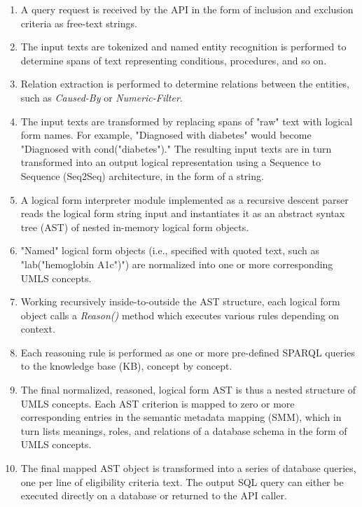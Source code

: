 \documentclass[../main.tex]{subfiles}
\begin{document}
\begin{enumerate}
    \item{A query request is received by the API in the form of inclusion and exclusion criteria as free-text strings.}
    \item{The input texts are tokenized and named entity recognition is performed to determine spans of text representing conditions, procedures, and so on.}
    \item{Relation extraction is performed to determine relations between the entities, such as \textit{Caused-By} or \textit{Numeric-Filter}.}
    \item{The input texts are transformed by replacing spans of "raw" text with logical form names. For example, "Diagnosed with diabetes" would become "Diagnosed with cond("diabetes")." The resulting input texts are in turn transformed into an output logical representation using a Sequence to Sequence (Seq2Seq) architecture, in the form of a string.}
    \item{A logical form interpreter module implemented as a recursive descent parser \cite{johnstone1998generalised} reads the logical form string input and instantiates it as an abstract syntax tree (AST) of nested in-memory logical form objects.}
    \item{"Named" logical form objects (i.e., specified with quoted text, such as "lab("hemoglobin A1c")") are normalized into one or more corresponding UMLS concepts.}
    \item{Working recursively inside-to-outside the AST structure, each logical form object calls a \textit{Reason()} method which executes various rules depending on context.}
    \item{Each reasoning rule is performed as one or more pre-defined SPARQL queries to the knowledge base (KB), concept by concept.}
    \item{The final normalized, reasoned, logical form AST is thus a nested structure of UMLS concepts. Each AST criterion is mapped to zero or more corresponding entries in the semantic metadata mapping (SMM), which in turn lists meanings, roles, and relations of a database schema in the form of UMLS concepts.}
    \item{The final mapped AST object is transformed into a series of database queries, one per line of eligibility criteria text. The output SQL query can either be executed directly on a database or returned to the API caller.}
\end{enumerate}
\end{document}
